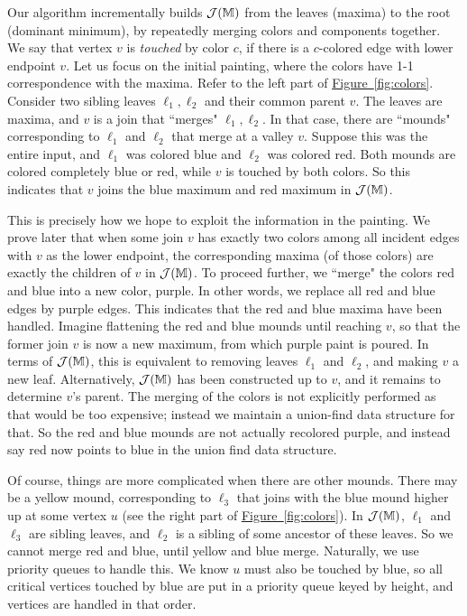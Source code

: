 \documentclass[11pt]{article}
\theoremstyle{definition}
\newcommand{\cJ}{{\cal J}}
\newcommand{\MM}{\mathbb{M}}
\newcommand{\Fig}[1]{\hyperref[fig:#1]{Figure~\ref*{fig:#1}}} %
\begin{document}
Our algorithm incrementally builds $\cJ(\MM)$ from the leaves (maxima) to the root (dominant minimum), by repeatedly merging colors and components together.  
We say that vertex $v$ is \emph{touched} by color $c$, if there is a $c$-colored edge with lower endpoint $v$.
Let us focus on the initial painting, where the colors have 1-1 correspondence with the maxima. Refer to the left part of \Fig{colors}.
Consider two sibling leaves $\ell_1, \ell_2$ and their common parent $v$. The leaves are maxima,
and $v$ is a join that ``merges" $\ell_1, \ell_2$. 
In that case, there are ``mounds" corresponding to $\ell_1$ and $\ell_2$ that merge
at a valley $v$. Suppose this was the entire input, and $\ell_1$ was colored blue and $\ell_2$ was colored red. 
Both mounds are colored completely blue or red, while $v$ is touched by both colors.
So this indicates that $v$ joins the blue maximum and red maximum in $\cJ(\MM)$.

This is precisely how we hope to exploit the information in the painting. We prove later that
when some join $v$ has exactly two colors among all incident edges with $v$ as the lower endpoint, the corresponding maxima (of those colors) are exactly
the children of $v$ in $\cJ(\MM)$. To proceed further, we ``merge" the colors red and blue into a new color, purple. In other words,
we replace all red and blue edges by purple edges. This indicates that the red and blue maxima have been
handled. Imagine flattening the red and blue mounds until reaching $v$, so that the former join $v$
is now a new maximum, from which purple paint is poured. In terms of $\cJ(\MM)$, this
is equivalent to removing leaves $\ell_1$ and $\ell_2$, and making $v$ a new leaf.
Alternatively, $\cJ(\MM)$ has been constructed up to $v$, and it remains to determine $v$'s parent.
The merging of the colors is not explicitly performed as that would be too expensive; instead we maintain a union-find
data structure for that. So the red and blue mounds are not actually recolored purple, 
and instead say red now points to blue in the union find data structure.

Of course, things are more complicated when there are other mounds. There may be a yellow mound,
corresponding to $\ell_3$ that joins with the blue mound higher up at some vertex $u$ (see the right part of \Fig{colors}). In $\cJ(\MM)$, $\ell_1$ and $\ell_3$
are sibling leaves, and $\ell_2$ is a sibling of some ancestor of these leaves. So we cannot
merge red and blue, until yellow and blue merge. Naturally, we use priority queues to handle this.
We know $u$ must also be touched by blue, so all critical vertices touched by blue
are put in a priority queue keyed by height, and vertices are handled in that order.
\end{document}
